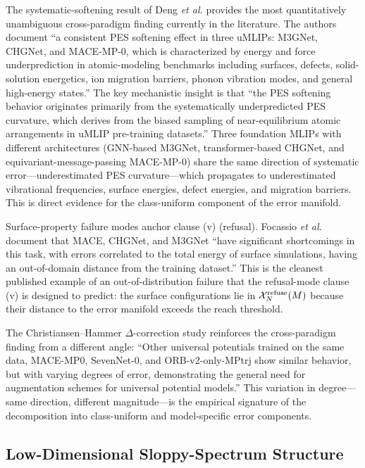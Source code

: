 The systematic-softening result of Deng \emph{et al.}\cite{deng2025systematic} provides the most quantitatively unambiguous cross-paradigm finding currently in the literature. The authors document ``a consistent PES softening effect in three uMLIPs: M3GNet, CHGNet, and MACE-MP-0, which is characterized by energy and force underprediction in atomic-modeling benchmarks including surfaces, defects, solid-solution energetics, ion migration barriers, phonon vibration modes, and general high-energy states.'' The key mechanistic insight is that ``the PES softening behavior originates primarily from the systematically underpredicted PES curvature, which derives from the biased sampling of near-equilibrium atomic arrangements in uMLIP pre-training datasets.'' Three foundation MLIPs with different architectures (GNN-based M3GNet, transformer-based CHGNet, and equivariant-message-passing MACE-MP-0) share the same direction of systematic error---underestimated PES curvature---which propagates to underestimated vibrational frequencies, surface energies, defect energies, and migration barriers. This is direct evidence for the class-uniform component of the error manifold.

Surface-property failure modes anchor clause (v) (refusal). Focassio \emph{et al.}\cite{focassio2025surfaces} document that MACE, CHGNet, and M3GNet ``have significant shortcomings in this task, with errors correlated to the total energy of surface simulations, having an out-of-domain distance from the training dataset.'' This is the cleanest published example of an out-of-distribution failure that the refusal-mode clause (v) is designed to predict: the surface configurations lie in $\mathcal{X}_N^{\text{refuse}}(M)$ because their distance to the error manifold exceeds the reach threshold.

The Christiansen--Hammer $\Delta$-correction study\cite{christiansen2025delta} reinforces the cross-paradigm finding from a different angle: ``Other universal potentials trained on the same data, MACE-MP0, SevenNet-0, and ORB-v2-only-MPtrj show similar behavior, but with varying degrees of error, demonstrating the general need for augmentation schemes for universal potential models.'' This variation in degree---same direction, different magnitude---is the empirical signature of the decomposition into class-uniform and model-specific error components.

\subsection{Low-Dimensional Sloppy-Spectrum Structure}\label{sec:sloppy}

